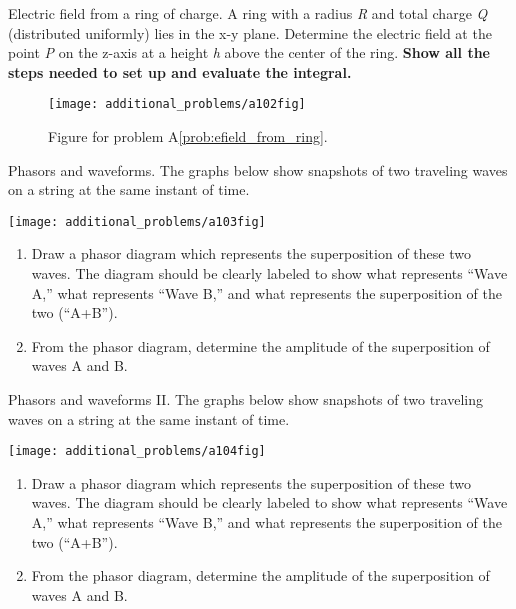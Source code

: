 \begin{aproblem}{Electric field from a ring of charge.}
  A ring with a radius {\it R} and total charge {\it Q} (distributed
  uniformly) lies in the x-y plane.  Determine the electric field at
  the point {\it P} on the z-axis at a height {\it h} above the center
  of the ring.  {\bf Show all the steps needed to set up and evaluate
    the integral.}
  \label{prob:efield_from_ring}
  \begin{figure}[h]
    \begin{center}
      \texttt{[image: additional\_problems/a102fig]}
      \caption{Figure for problem A\ref{prob:efield_from_ring}.}
      \label{fig:a102}
    \end{center}
  \end{figure}
\end{aproblem}

\begin{aproblem}{ Phasors and waveforms.}
  The graphs below show snapshots of two traveling waves on a string
  at the same instant of time.
  \label{prob:phasors_and_waveforms}

  \begin{center}
    \texttt{[image: additional\_problems/a103fig]}
  \end{center}

  \begin{enumerate}
  \item Draw a phasor diagram which represents the superposition of
    these two waves.  The diagram should be clearly labeled to show
    what represents ``Wave A,'' what represents ``Wave B,'' and what
    represents the superposition of the two (``A+B'').

  \item From the phasor diagram, determine the amplitude of the
    superposition of waves A and B.

  \end{enumerate}
\end{aproblem}

\newpage

\begin{aproblem}{Phasors and waveforms II.}
  The graphs below show snapshots of two traveling waves on a string
  at the same instant of time.

  \begin{center}
    \texttt{[image: additional\_problems/a104fig]}
  \end{center}

  \begin{enumerate}
  \item Draw a phasor diagram which represents the superposition of
    these two waves.  The diagram should be clearly labeled to show
    what represents ``Wave A,'' what represents ``Wave B,'' and what
    represents the superposition of the two (``A+B'').

  \item From the phasor diagram, determine the amplitude of the
    superposition of waves A and B.

  \end{enumerate}
\end{aproblem}


